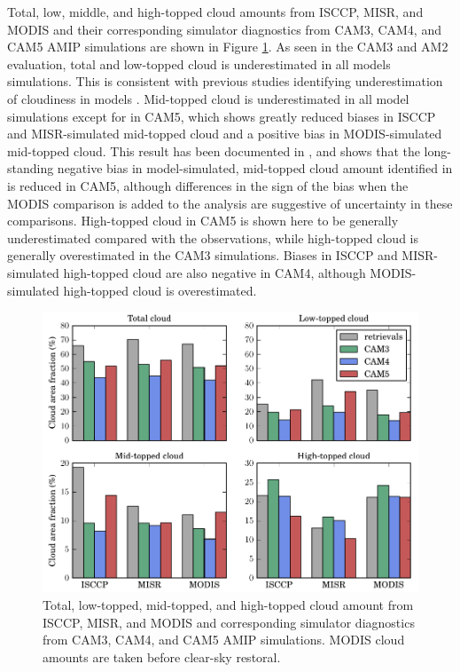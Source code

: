 Total, low, middle, and high-topped cloud amounts from ISCCP, MISR, and MODIS and their corresponding simulator diagnostics from CAM3, CAM4, and CAM5 AMIP simulations are shown in Figure \ref{cldtypes_camamip_bar}. As seen in the CAM3 and AM2 evaluation, total and low-topped cloud is underestimated in all models simulations. This is consistent with previous studies identifying underestimation of cloudiness in models \citep{zhang_et_al_2005}. Mid-topped cloud is underestimated in all model simulations except for in CAM5, which shows greatly reduced biases in ISCCP and MISR-simulated mid-topped cloud and a positive bias in MODIS-simulated mid-topped cloud. This result has been documented in \cite{kay_et_al_2011}, and shows that the long-standing negative bias in model-simulated, mid-topped cloud amount identified in \cite{zhang_et_al_2005} is reduced in CAM5, although differences in the sign of the bias when the MODIS comparison is added to the analysis are suggestive of uncertainty in these comparisons. High-topped cloud in CAM5 is shown here to be generally underestimated compared with the observations, while high-topped cloud is generally overestimated in the CAM3 simulations. Biases in ISCCP and MISR-simulated high-topped cloud are also negative in CAM4, although MODIS-simulated high-topped cloud is overestimated. 
\begin{figure}
    \centering
    \includegraphics{../graphics/cldtypes_camamip_bar.pdf}
    \caption[Total, low-topped, mid-topped, and high-topped cloud amount from ISCCP, MISR, and MODIS and corresponding simulator diagnostics from CAM3, CAM4, and CAM5 AMIP simulations.]{Total, low-topped, mid-topped, and high-topped cloud amount from ISCCP, MISR, and MODIS and corresponding simulator diagnostics from CAM3, CAM4, and CAM5 AMIP simulations. MODIS cloud amounts are taken before clear-sky restoral.}
    \label{cldtypes_camamip_bar}
\end{figure}

